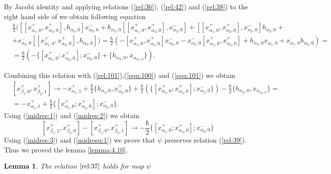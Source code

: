 \documentclass[english]{elsarticle}
\newtheorem{lemma}{Lemma}[section]
\numberwithin{equation}{section}
\begin{document}
By Jacobi identity and applying relations (\ref{rel:36}), (\ref{rel:42}) and (\ref{rel:38}) to the right hand side of we obtain following equation
\begin{equation}
\begin{split}
&\frac{\hbar}{2}([[x_{\alpha_{1},0}^{+}, x_{\alpha_{2},0}^{+}], h_{\alpha_{2},0}]x_{\alpha_{2},0}^{-}+h_{\alpha_{2},0}[[x_{\alpha_{1},0}^{+},x_{\alpha_{2},0}^{+}],x_{\alpha_{2},0}^{-}] +
[[x_{\alpha_{1},0}^{+},x_{\alpha_{2},0}^{+}],x_{\alpha_{2},0}^{-}]h_{\alpha_{2},0} +\\
&+x_{\alpha_{2},0}^{-}[[x_{\alpha_{1},0}^{+},x_{\alpha_{2},0}^{+}],h_{\alpha_{2},0}]) =
\frac{\hbar}{2}(-[x_{\alpha_{1},0}^{+},x_{\alpha_{2},0}^{+}]x_{\alpha_{2},0}^{-} - x_{\alpha_{2},0}^{-}[x_{\alpha_{1},0}^{+},x_{\alpha_{2},0}^{+}] + h_{\alpha_{2},0}x_{\alpha_{1},0}+x_{\alpha_{1},0}h_{\alpha_{2},0}) = \\
&= \frac{\hbar}{2}(-\{[x_{\alpha_{1},0}^{+};x_{\alpha_{2},0}^{+}];x_{\alpha_{2},0}^{-}\} + \{h_{\alpha_{2},0}, x_{\alpha_{\alpha_{1},0}}\}).
\end{split}
\end{equation}

Combining this relation with (\ref{rel:101}),(\ref{equ:100}) and (\ref{equ:101}) we obtain
\begin{equation}
\label{midres:2}
\begin{split}
&[x_{\beta_1,0}^+,x_{\beta_2,1}^+]\rightarrow -x_{\alpha_1,1}^+ + \frac{\hbar}{2}\{h_{\alpha_2,0},x_{\alpha_2,0}^+\}+\frac{\hbar}{2}(\{[x_{\alpha_{1},0}^{+}; x_{\alpha_{2},0}^{+}];x_{\alpha_{2},0}^{-}\}) - \frac{\hbar}{2}\{h_{\alpha_{2},0},x_{\alpha_{\alpha_{1},0}}\} =\\
&= -x_{\alpha_1,1}^++\frac{\hbar}{2}\{[x_{\alpha_{1},0}^{+};x_{\alpha_{2},0}^{+}];x_{\alpha_{2},0}^{-}\}.
\end{split}
\end{equation}
Using (\ref{midres:1}) and (\ref{midres:2}) we obtain
\begin{equation}
\label{midresu:1}
[x_{\beta_1,1}^+,x_{\beta_2,0}^+]-[x_{\beta_1,0}^+,x_{\beta_2,1}^+]\rightarrow-\frac{\hbar}{2}\{[x_{\alpha_{1},0}^{+};x_{\alpha_{2},0}^{+}];x_{\alpha_{2},0}^{-}\}
\end{equation}
Using (\ref{midres:3}) and (\ref{midresu:1}) we prove that $\psi$ preserves relation (\ref{rel:39}).
Thus we proved the lemma \ref{lemma:4.10},


\begin{lemma}
\label{lemma:4.11}
    The relation $\ref{rel:37}$ holds for map $\psi$
\end{lemma}
\end{document}
